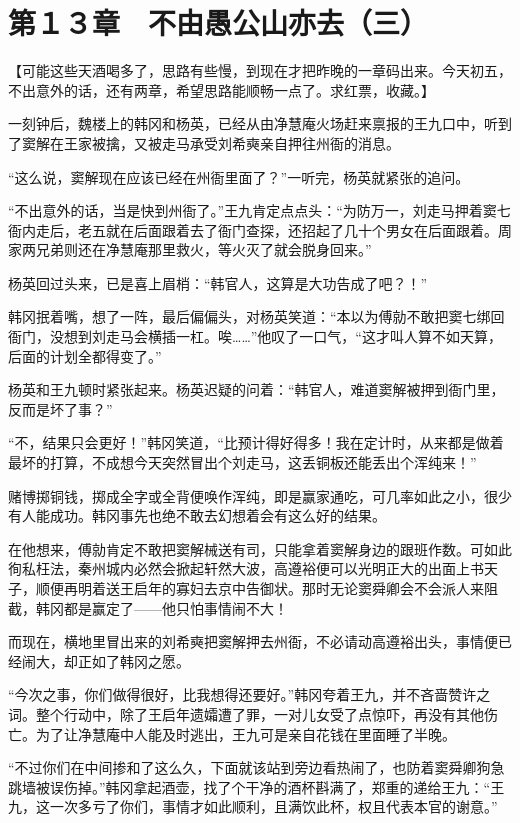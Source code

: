 \section{第１３章　不由愚公山亦去（三）}

【可能这些天酒喝多了，思路有些慢，到现在才把昨晚的一章码出来。今天初五，不出意外的话，还有两章，希望思路能顺畅一点了。求红票，收藏。】

一刻钟后，魏楼上的韩冈和杨英，已经从由净慧庵火场赶来禀报的王九口中，听到了窦解在王家被擒，又被走马承受刘希奭亲自押往州衙的消息。

“这么说，窦解现在应该已经在州衙里面了？”一听完，杨英就紧张的追问。

“不出意外的话，当是快到州衙了。”王九肯定点点头：“为防万一，刘走马押着窦七衙内走后，老五就在后面跟着去了衙门查探，还招起了几十个男女在后面跟着。周家两兄弟则还在净慧庵那里救火，等火灭了就会脱身回来。”

杨英回过头来，已是喜上眉梢：“韩官人，这算是大功告成了吧？！”

韩冈抿着嘴，想了一阵，最后偏偏头，对杨英笑道：“本以为傅勍不敢把窦七绑回衙门，没想到刘走马会横插一杠。唉……”他叹了一口气，“这才叫人算不如天算，后面的计划全都得变了。”

杨英和王九顿时紧张起来。杨英迟疑的问着：“韩官人，难道窦解被押到衙门里，反而是坏了事？”

“不，结果只会更好！”韩冈笑道，“比预计得好得多！我在定计时，从来都是做着最坏的打算，不成想今天突然冒出个刘走马，这丢铜板还能丢出个浑纯来！”

赌博掷铜钱，掷成全字或全背便唤作浑纯，即是赢家通吃，可几率如此之小，很少有人能成功。韩冈事先也绝不敢去幻想着会有这么好的结果。

在他想来，傅勍肯定不敢把窦解械送有司，只能拿着窦解身边的跟班作数。可如此徇私枉法，秦州城内必然会掀起轩然大波，高遵裕便可以光明正大的出面上书天子，顺便再明着送王启年的寡妇去京中告御状。那时无论窦舜卿会不会派人来阻截，韩冈都是赢定了——他只怕事情闹不大！

而现在，横地里冒出来的刘希奭把窦解押去州衙，不必请动高遵裕出头，事情便已经闹大，却正如了韩冈之愿。

“今次之事，你们做得很好，比我想得还要好。”韩冈夸着王九，并不吝啬赞许之词。整个行动中，除了王启年遗孀遭了罪，一对儿女受了点惊吓，再没有其他伤亡。为了让净慧庵中人能及时逃出，王九可是亲自花钱在里面睡了半晚。

“不过你们在中间掺和了这么久，下面就该站到旁边看热闹了，也防着窦舜卿狗急跳墙被误伤掉。”韩冈拿起酒壶，找了个干净的酒杯斟满了，郑重的递给王九：“王九，这一次多亏了你们，事情才如此顺利，且满饮此杯，权且代表本官的谢意。”

